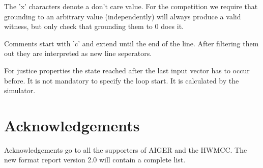 \documentclass{llncs}
\begin{document}
The 'x' characters denote a don't care value.  For the competition
we require that grounding to an arbitrary value (independently) will
always produce a valid witness, but only check that grounding them
to 0 does it. 

Comments start with 'c' and extend until the end of the line.
After filtering them out they are interpreted as new line seperators.

For justice properties the state reached after the last input vector
has to occur before.  It is not mandatory to specify the
loop start.  It is calculated by the simulator.

\section{Acknowledgements}

Acknowledgements go to all the supporters of AIGER and the HWMCC.
The new format report version 2.0 will contain a complete list.
\end{document}

